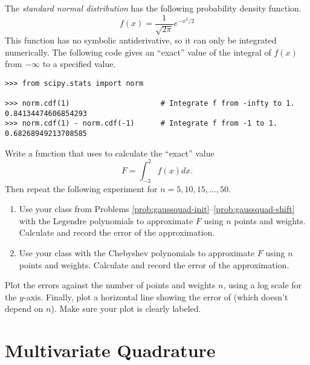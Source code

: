 \begin{problem} %
The \emph{standard normal distribution} has the following probability density function.
\[f(x) = \frac{1}{\sqrt{2 \pi}} e^{-x^2/2}\]
This function has no symbolic antiderivative, so it can only be integrated numerically.
The following code gives an ``exact'' value of the integral of $f(x)$ from $-\infty$ to a specified value.

\begin{lstlisting}
>>> from scipy.stats import norm

>>> norm.cdf(1)                     # Integrate f from -infty to 1.
0.84134474606854293
>>> norm.cdf(1) - norm.cdf(-1)      # Integrate f from -1 to 1.
0.68268949213708585
\end{lstlisting}

Write a function that uses  to calculate the ``exact'' value
\[
F = \int_{-3}^2 f(x)dx.
\]
Then repeat the following experiment for $n=5,10,15,\ldots,50$.
\begin{enumerate}
\item Use your class from Problems \ref{prob:gaussquad-init}--\ref{prob:gaussquad-shift} with the Legendre polynomials to approximate $F$ using $n$ points and weights.
Calculate and record the error of the approximation.
\item Use your class with the Chebyshev polynomials to approximate $F$ using $n$ points and weights.
Calculate and record the error of the approximation.
\end{enumerate}
Plot the errors against the number of points and weights $n$, using a log scale for the $y$-axis.
Finally, plot a horizontal line showing the error of  (which doesn't depend on $n$).
Make sure your plot is clearly labeled.
\end{problem}


\section*{Multivariate Quadrature} %


